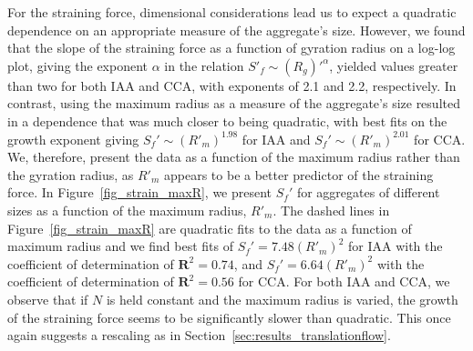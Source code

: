 For the straining force, dimensional considerations lead us to expect a quadratic dependence on an appropriate measure of the aggregate's size. However, we found that the slope of the straining force as a function of gyration radius on a log-log plot, giving the exponent $\alpha$ in the relation $S'_f \sim (R_g)'^{\alpha}$, yielded values greater than two for both IAA and CCA, with exponents of 2.1 and 2.2, respectively. In contrast, using the maximum radius as a measure of the aggregate's size resulted in a dependence that was much closer to being quadratic, with best fits on the growth exponent giving $S_f' \sim (R'_m)^{1.98}$ for IAA and $S_f' \sim (R'_m)^{2.01}$ for CCA. 
We, therefore, present the data as a function of the maximum radius rather than the gyration radius, as $R'_m$ appears to be a better predictor of the straining force.
In Figure~\ref{fig_strain_maxR}, we present $S_f'$ for aggregates 
of different sizes as a function of the maximum 
radius, $R'_m$. 
The dashed lines in  Figure~\ref{fig_strain_maxR}  are quadratic fits to the data as a function of maximum radius and we find best fits of $S_f' = 7.48 (R'_m)^2$ for IAA with the coefficient of determination of $\mathbf{R}^2=0.74$, and $S_f' = 6.64 (R'_m)^2$ with the coefficient of determination of $\mathbf{R}^2=0.56$ for CCA. For both IAA and CCA, we observe that if $N$ is held constant and the maximum radius is varied, the growth of the straining force seems to be significantly slower than quadratic. This once again suggests a rescaling as in Section~\ref{sec:results_translationflow}. 

